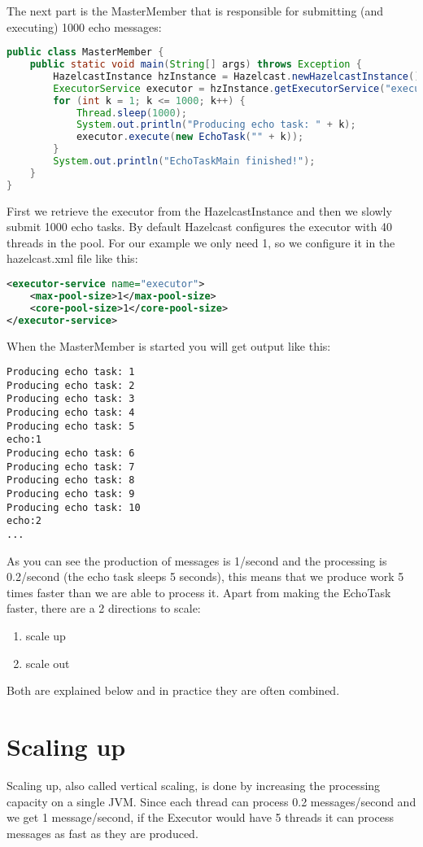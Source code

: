 The next part is the MasterMember that is responsible for submitting (and executing) 1000 echo messages:
\begin{lstlisting}[language=java]
public class MasterMember {
    public static void main(String[] args) throws Exception {
        HazelcastInstance hzInstance = Hazelcast.newHazelcastInstance();
        ExecutorService executor = hzInstance.getExecutorService("executor");
        for (int k = 1; k <= 1000; k++) {
            Thread.sleep(1000);
            System.out.println("Producing echo task: " + k);
            executor.execute(new EchoTask("" + k));
        }
        System.out.println("EchoTaskMain finished!");
    }
}
\end{lstlisting}
First we retrieve the executor from the HazelcastInstance and then we slowly submit 1000 echo tasks. By default Hazelcast configures the executor with 40 threads in the pool. For our example we only need 1, so we configure it in the hazelcast.xml file like this:
\begin{lstlisting}[language=xml]
<executor-service name="executor">
    <max-pool-size>1</max-pool-size>
    <core-pool-size>1</core-pool-size>
</executor-service>
\end{lstlisting}
When the MasterMember is started you will get output like this:
\begin{lstlisting}
Producing echo task: 1
Producing echo task: 2
Producing echo task: 3
Producing echo task: 4
Producing echo task: 5
echo:1
Producing echo task: 6
Producing echo task: 7
Producing echo task: 8
Producing echo task: 9
Producing echo task: 10
echo:2
...
\end{lstlisting}
As you can see the production of messages is 1/second and the processing is 0.2/second (the echo task sleeps 5 seconds), this means that we produce work 5 times faster than we are able to process it. Apart from making the EchoTask faster, there are a 2 directions to scale:
\begin{enumerate}
\item scale up 
\item scale out
\end{enumerate}
Both are explained below and in practice they are often combined. 

\section{Scaling up}
Scaling up, also called vertical scaling, is done by increasing the processing capacity on a single JVM. Since each thread can process 0.2 messages/second and we get 1 message/second, if the Executor would have 5 threads it can process messages as fast as they are produced.

